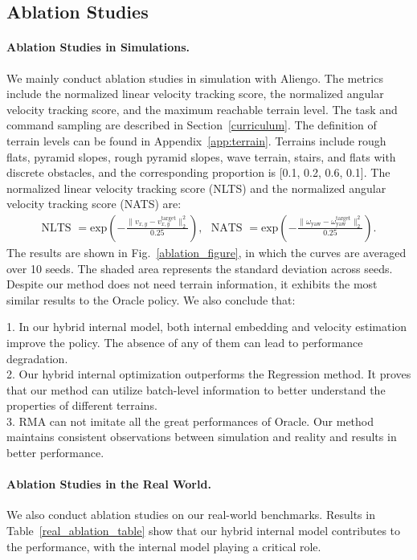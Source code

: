 \subsection{Ablation Studies}
\label{ablation}
\paragraph{Ablation Studies in Simulations.}
We mainly conduct ablation studies in simulation with Aliengo. The metrics include the normalized linear velocity tracking score, the normalized angular velocity tracking score, and the maximum reachable terrain level.
The task and command sampling are described in Section~\ref{curriculum}. The definition of terrain levels can be found in Appendix~\ref{app:terrain}. Terrains include rough flats, pyramid slopes, rough pyramid slopes, wave terrain, stairs, and flats with discrete obstacles, and the corresponding proportion is [0.1, 0.2, 0.6, 0.1]. The normalized linear velocity tracking score (NLTS) and the normalized angular velocity tracking score (NATS) are:
\begin{align*}
        \text{NLTS } = \text{exp}(-\frac{\|v_{x,y} - v_{x,y}^{\text{target}}\|^2_2}{0.25}), \text{  }
        \text{NATS } = \text{exp}(-\frac{\|\omega_{\text{yaw}} - \omega_{\text{yaw}}^{\text{target}}\|^2_2}{0.25}).
\end{align*}
The results are shown in Fig.~\ref{ablation_figure}, in which the curves are averaged over 10 seeds. 
The shaded area represents the standard deviation across seeds. 
Despite our method does not need terrain information, it exhibits the most similar results to the Oracle policy.
We also conclude that:

1. In our hybrid internal model, both internal embedding and velocity estimation improve the policy. The absence of any of them can lead to performance degradation.\\
2. Our hybrid internal optimization outperforms the Regression method. It proves that our method can utilize batch-level information to better understand the properties of different terrains. \\
3. RMA can not imitate all the great performances of Oracle. Our method maintains consistent observations between simulation and reality and results in better performance. 

\paragraph{Ablation Studies in the Real World.}
We also conduct ablation studies on our real-world benchmarks. Results in Table~\ref{real_ablation_table} show that our hybrid internal model contributes to the performance, with the internal model playing a critical role.

